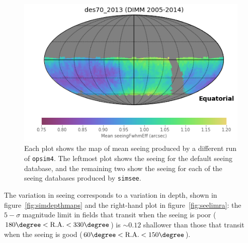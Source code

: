 \documentclass[\docopts]{\docclass}
\begin{document}
\begin{figure}
\endminipage\hfill
{}
  \includegraphics[width=\columnwidth]{seeing_map_2013.png}
\endminipage\hfill
  \caption{Each plot shows the map of mean seeing
    produced by a different run of \texttt{opsim4}. The leftmost plot
    shows the seeing for the default seeing database, and the
    remaining two show the seeing for each of the seeing databases
    produced by \texttt{simsee}.} 
  \label{fig:simseemaps}
\end{figure}

The variation in seeing corresponds to a variation in depth, shown in
figure~\ref{fig:simdepthmaps} and the right-hand plot in
figure~\ref{fig:seelimra}: the $5-\sigma$ magnitude limit in fields
that transit when the seeing is poor ($180\degree < \mbox{R.A.} <
330\degree$) is $\sim 0.12$ shallower than those that transit when the
seeing is good ($60\degree < \mbox{R.A.} < 150\degree$).
\end{document}
